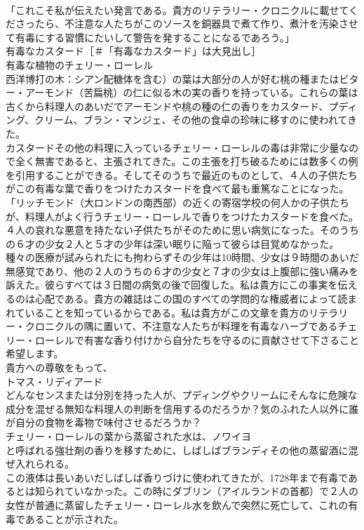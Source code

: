 \documentclass[8pt]{extreport}
\begin{document}
\begin{CJK}{UTF8}{min}
\\	「これこそ私が伝えたい発言である。貴方のリテラリー・クロニクルに載せてくださったら、不注意な人たちがこのソースを銅器具で煮て作り、煮汁を汚染させて有毒にする習慣にたいして警告を発することになるであろう。」
\\	有毒なカスタード［＃「有毒なカスタード」は大見出し］
\\	有毒な植物のチェリー・ローレル
\\	西洋博打の木：シアン配糖体を含む）の葉は大部分の人が好む桃の種またはビター・アーモンド（苦扁桃）の仁に似る木の実の香りを持っている。これらの葉は古くから料理人のあいだでアーモンドや桃の種の仁の香りをカスタード、プディング、クリーム、ブラン・マンジェ、その他の食卓の珍味に移すのに使われてきた。
\\	カスタードその他の料理に入っているチェリー・ローレルの毒は非常に少量なので全く無害であると、主張されてきた。この主張を打ち破るためには数多くの例を引用することができる。そしてそのうちで最近のものとして、４人の子供たちがこの有毒な葉で香りをつけたカスタードを食べて最も重篤なことになった。
\\	「リッチモンド（大ロンドンの南西部）の近くの寄宿学校の何人かの子供たちが、料理人がよく行うチェリー・ローレルで香りをつけたカスタードを食べた。４人の哀れな悪意を持たない子供たちがそのために思い病気になった。そのうちの６才の少女２人と５才の少年は深い眠りに陥って彼らは目覚めなかった。
\\	種々の医療が試みられたにも拘わらずその少年は10時間、少女は９時間のあいだ無感覚であり、他の２人のうちの６才の少女と７才の少女は上腹部に強い痛みを訴えた。彼らすべては３日間の病気の後で回復した。私は貴方にこの事実を伝えるのは心配である。貴方の雑誌はこの国のすべての学問的な権威者によって読まれていることを知っているからである。私は貴方がこの文章を貴方のリテラリー・クロニクルの隅に置いて、不注意な人たちが料理を有毒なハーブであるチェリー・ローレルで有害な香り付けから自分たちを守るのに貢献させて下さること希望します。
\\	貴方への尊敬をもって、
\\	トマス・リディアード
\\	どんなセンスまたは分別を持った人が、プディングやクリームにそんなに危険な成分を混ぜる無知な料理人の判断を信用するのだろうか？気のふれた人以外に誰が自分の食物を毒物で味付させるだろうか？
\\	チェリー・ローレルの葉から蒸留された水は、ノワイヨ
\\	と呼ばれる強壮剤の香りを移すために、しばしばブランディその他の蒸留酒に混ぜ入れられる。
\\	この液体は長いあいだしばしば香りづけに使われてきたが、1728年まで有毒であるとは知られていなかった。この時にダブリン（アイルランドの首都）で２人の女性が普通に蒸留したチェリー・ローレル水を飲んで突然に死亡して、これの有毒であることが示された。

\end{CJK}
\end{document}
